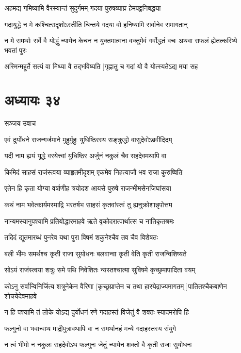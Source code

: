 \twolineshloka
{अहमद्य गमिष्यामि वैरस्यान्तं सुदुर्गमम्}
{गदया पुरुषव्याघ्र हेमपट्टनिबद्धया}


\twolineshloka
{गदायुद्धे न मे कश्चित्सदृशोऽस्तीति चिन्तये}
{गदया वो हनिष्यामि सर्वानेव समागतान्}


\threelineshloka
{न मे समर्थाः सर्वे वै योद्धुं न्यायेन केचन}
{न युक्तमात्मना वक्तुमेवं गर्वोद्धतं वचः}
{अथवा सफलं ह्येतत्करिष्ये भवतां पुरः}


\twolineshloka
{अस्मिन्महूर्ते सत्यं वा मिथ्या वै तद्भविष्यति}
{]गृह्णातु च गदां यो वै योत्स्यतेऽद्य मया सह}


\chapter{अध्यायः ३४}
\twolineshloka
{सञ्जय उवाच}
{}


\twolineshloka
{एवं दुर्योधने राजन्गर्जमाने मुहुर्मुहुः}
{युधिष्ठिरस्य सङ्क्रुद्धो वासुदेवोऽब्रवीदिदम्}


\twolineshloka
{यदी नाम ह्ययं यूद्धे वरयेत्त्वां युधिष्ठिर}
{अर्जुनं नकुलं चैव सहदेवमथापि वा}


\twolineshloka
{किमिदं साहसं राजंस्त्वया व्याहृतमीदृशम्}
{एकमेव निहत्याजौ भव राजा कुरुष्विति}


\twolineshloka
{एतेन हि कृता योग्या वर्षाणीह त्रयोदश}
{आयसे पुरुषे राजन्भीमसेनजिघांसया}


\twolineshloka
{कथं नाम भवेत्कार्यमस्माद्वि भरतर्षभ}
{साहसं कृतवांस्त्वं तु ह्यनुक्रोशान्नृपोत्तम}


\twolineshloka
{नान्यमस्यानुपश्यामि प्रतियोद्धारमाहवे}
{ऋते वृकोदरात्पार्थात्स च नातिकृतश्रमः}


\twolineshloka
{तदिदं द्यूतमारब्धं पुनरेव यथा पुरा}
{विषमं शकुनेश्चैव तव चैव विशेषतः}


\twolineshloka
{बली भीमः समर्थश्च कृती राजा सुयोधनः}
{बलवान्वा कृती वेति कृती राजन्विशिष्यते}


\twolineshloka
{सोऽयं राजंस्त्वया शत्रुः समे पथि निवेशितः}
{न्यस्तश्चात्मा सुविषमे कृच्छ्रमापादिता वयम्}


\threelineshloka
{कोऽनु सर्वान्विनिर्जित्य शत्रूनेकेन वैरिणा}
{[कृच्छ्रप्राप्तेन च तथा हारयेद्राज्यमागतम्}
{]पातितश्चैकबाणेन शोचयेदेवमाहवे}


\twolineshloka
{न हि पश्यामि तं लोके योऽद्य दुर्योधनं रणे}
{गदाहस्तं विजेतुं वै शक्तः स्यादमरोपि हि}


\twolineshloka
{फल्गुनो वा भवान्वाथ माद्रीपुत्रावथापि वा}
{न समर्थानहं मन्ये गदाहस्तस्य संयुगे}


\twolineshloka
{न त्वं भीमो न नकुलः सहदेवोऽथ फल्गुनः}
{जेतुं न्यायेन शक्तो वै कृती राजा सुयोधनः}


